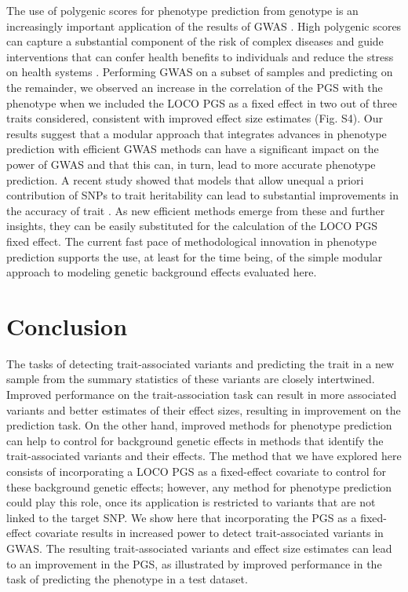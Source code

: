 \documentclass[fleqn,10pt]{wlscirep}
\begin{document}
The use of polygenic scores for phenotype prediction from genotype is an increasingly important application of the results of GWAS \cite{martin2019predicting}. High polygenic scores can capture a substantial component of the risk of complex diseases  \cite{khera2018genome, mars2020polygenic} and guide interventions that can confer health benefits to individuals and reduce the stress on health systems \cite{gibson2019utilization}. Performing GWAS on a subset of samples and predicting on the remainder, we observed an increase in the correlation of the PGS with the phenotype when we included the LOCO PGS as a fixed effect in two out of three traits considered, consistent with improved effect size estimates (Fig. S4). Our results suggest that a modular approach that integrates advances in phenotype prediction with efficient GWAS methods can have a significant impact on the power of GWAS and that this can, in turn, lead to more accurate phenotype prediction. A recent study showed that models that allow unequal a priori contribution of SNPs to trait heritability can lead to substantial improvements in the accuracy of trait \cite{zhang2020improved}. As new efficient methods emerge from these and further insights, they can be easily substituted for the calculation of the LOCO PGS fixed effect. The current fast pace of methodological innovation in phenotype prediction supports the use, at least for the time being, of the simple modular approach to modeling genetic background effects evaluated here.


\section*{Conclusion}

The tasks of detecting trait-associated variants and predicting the trait in a new sample from the summary statistics of these variants are closely intertwined. Improved performance on the trait-association task can result in more associated variants and better estimates of their effect sizes, resulting in improvement on the prediction task. On the other hand, improved methods for phenotype prediction can help to control for background genetic effects in methods that identify the trait-associated variants and their effects. The method that we have explored here consists of incorporating a LOCO PGS as a fixed-effect covariate to control for these background genetic effects; however, any method for phenotype prediction could play this role, once its application is restricted to variants that are not linked to the target SNP. We show here that incorporating the PGS as a fixed-effect covariate results in increased power to detect trait-associated variants in GWAS. The resulting trait-associated variants and effect size estimates can lead to an improvement in the PGS, as illustrated by improved performance in the task of predicting the phenotype in a test dataset. 
\end{document}
